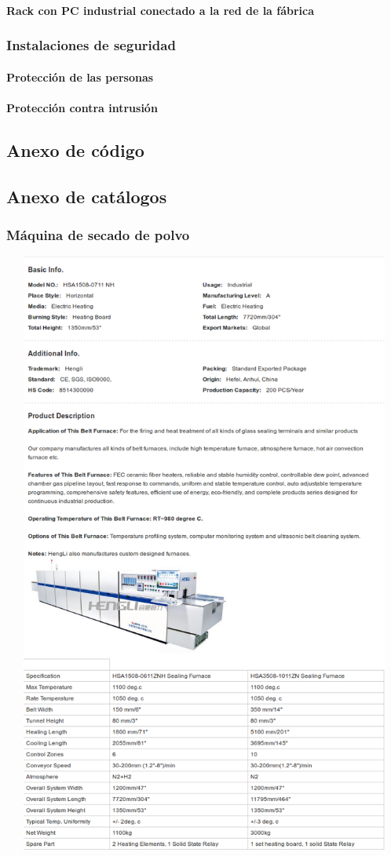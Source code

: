 \paragraph{Rack con PC industrial conectado a la red de la fábrica}
\subsubsection{Instalaciones de seguridad}
\paragraph{Protección de las personas}
\paragraph{Protección contra intrusión}

\subsection{Anexo de código}
\newpage
\subsection{Anexo de catálogos}
\subsubsection{Máquina de secado de polvo}
\includegraphics[width=15cm,height=20cm,keepaspectratio]{Datasheets/1Horno.png} 
\newpage

